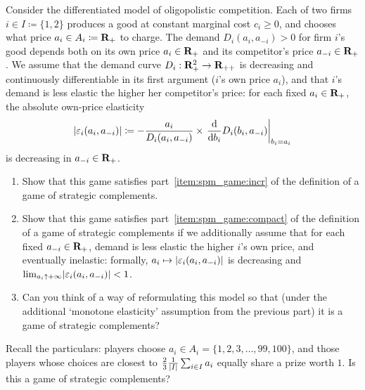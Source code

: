 \begin{exercise}
	\label{exercise:bertrand_spm_diff}
	Consider the differentiated \textcite{Bertrand1883} model of oligopolistic competition.
	Each of two firms $i \in I \coloneqq \{1,2\}$ produces a good at constant marginal cost $c_i \geq 0$, and chooses what price $a_i \in A_i \coloneqq \mathbf{R}_+$ to charge. The demand $D_i(a_i,a_{-i}) > 0$ for firm $i$'s good depends both on its own price $a_i \in \mathbf{R}_+$ and its competitor's price $a_{-i} \in \mathbf{R}_+$. We assume that the demand curve $D_i : \mathbf{R}_+^2 \to \mathbf{R}_{++}$ is decreasing and continuously differentiable in its first argument ($i$'s own price $a_i$), and that $i$'s demand is less elastic the higher her competitor's price: for each fixed $a_i \in \mathbf{R}_+$, the absolute own-price elasticity
	\begin{equation*}
		\abs*{ \eps_i(a_i,a_{-i}) }
		\coloneqq - \frac{a_i}{D_i(a_i,a_{-i})}
		\times
		\left. \frac{\dd}{\dd b_i} D_i(b_i,a_{-i}) \right|_{b_i = a_i}
	\end{equation*}
	is decreasing in $a_{-i} \in \mathbf{R}_+$.

	\begin{enumerate}[label=(\alph*)]
	
		\item Show that this game satisfies part~\ref{item:spm_game:incr} of the definition of a game of strategic complements.

		\item Show that this game satisfies part~\ref{item:spm_game:compact} of the definition of a game of strategic complements if we additionally assume that for each fixed $a_{-i} \in \mathbf{R}_+$, demand is less elastic the higher $i$'s own price, and eventually inelastic: formally, $a_i \mapsto \abs*{ \eps_i(a_i,a_{-i}) }$ is decreasing and $\lim_{a_i \uparrow +\infty} \abs*{ \eps_i(a_i,a_{-i}) } < 1$.

		\item Can you think of a way of reformulating this model so that (under the additional `monotone elasticity' assumption from the previous part) it is a game of strategic complements?
	
	\end{enumerate}
\end{exercise}

\begin{namedthm}
	\label{exercise:nagel_spm}
	Recall the particulars: players choose $a_i \in A_i = \{1,2,3,\dots,99,100\}$, and those players whose choices are closest to $\frac{2}{3} \frac{1}{\abs*{I}} \sum_{i \in I} a_i$ equally share a prize worth $1$. Is this a game of strategic complements?
\end{namedthm}

